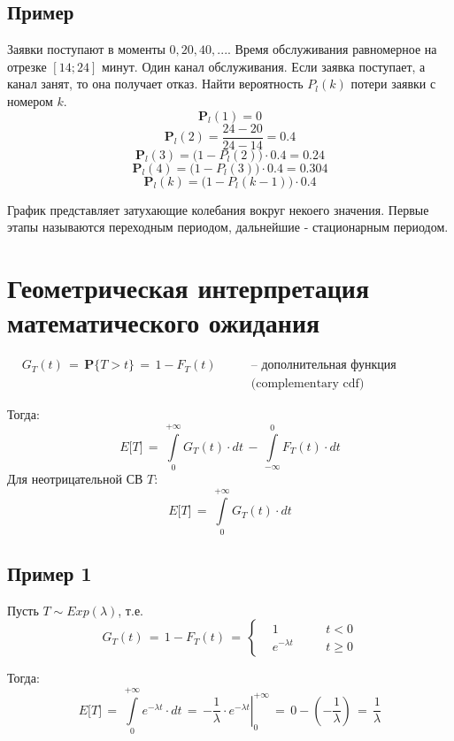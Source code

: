 \documentclass{article}
\begin{document}
\subsection*{Пример}
Заявки поступают в моменты $ 0,20,40,... $. Время обслуживания равномерное на отрезке $ [14;24] $ минут. Один канал обслуживания. Если заявка поступает, а канал занят, то она получает отказ. Найти вероятность $ P_l(k) $ потери заявки с номером $ k $.
\[ \mathbf{P}_l(1) \! = \! 0 \]
\[ \mathbf{P}_l(2) \! = \! \dfrac{24 \! - \! 20}{24 \! - \! 14} \! = \! 0.4 \]
\[ \mathbf{P}_l(3) \! = \! \big( 1 \! - \! P_l(2) \big) \! \cdot \! 0.4 \! = \! 0.24 \]
\[ \mathbf{P}_l(4) \! = \! \big( 1 \! - \! P_l(3) \big) \! \cdot \! 0.4 \! = \! 0.304 \]
\[ \mathbf{P}_l(k) \! = \! \big( 1 \! - \! P_l(k \! - \! 1) \big) \! \cdot \! 0.4 \! \]\par
График представляет затухающие колебания вокруг некоего значения. Первые этапы называются переходным периодом, дальнейшие - стационарным периодом.
\section*{Геометрическая интерпретация математического ожидания}
\begin{equation*}
\begin{aligned}
& G_T (t) \, = \, \mathbf{P} \big\{ T \! > \! t \big\} \, = \, 1 \! - \! F_T(t) \qquad & \text{-- дополнительная функция распределения} \\
& & \text{(complementary cdf)}
\end{aligned}
\end{equation*}\par
Тогда:
\[ E \big[ T \big] \, = \, \int\limits_0^{+\infty} G_T(t) \! \cdot \! dt \, - \, \int\limits_{-\infty}^0 F_T(t) \! \cdot \! dt \]
Для неотрицательной СВ $ T $:
\[ E \big[ T \big] \, = \, \int\limits_0^{+\infty} G_T(t) \! \cdot \! dt \]
\subsection*{Пример 1}
Пусть $ T \! \sim \! Exp(\lambda) $, т.е.
\begin{equation*}
G_T(t) \, = \, 1 \! - \! F_T(t) \, = \,
\left\{
\begin{aligned}
& 1 & & \quad t \! < \! 0 \\
& e^{-\lambda t} & & \quad t \! \geqslant \! 0
\end{aligned}
\right.
\end{equation*}\par
Тогда:
\[ E \big[ T \big] \, = \, \int\limits_0^{+\infty} e^{-\lambda t} \! \cdot \! dt \, = \, \left. -\dfrac{1}{\lambda} \! \cdot \! e^{-\lambda t} \right|_0^{+\infty} \, = \, 0 \! - \! \left( -\dfrac{1}{\lambda} \right) \, = \, \dfrac{1}{\lambda} \]
\end{document}
